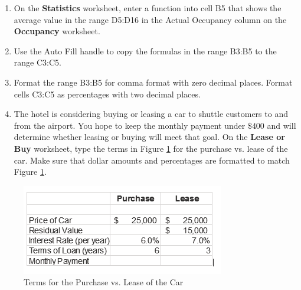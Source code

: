 \begin{enumerate}
	\item On the \textbf{Statistics} worksheet, enter a function into cell \textsf{B5} that shows the average value in the range \textsf{D5:D16} in the Actual Occupancy column on the \textbf{Occupancy} worksheet.
	
	\item Use the Auto Fill handle to copy the formulas in the range \textsf{B3:B5} to the range \textsf{C3:C5}.
	
	\item Format the range \textsf{B3:B5} for comma format with zero decimal places. Format cells \textsf{C3:C5} as percentages with two decimal places.
	
	\item The hotel is considering buying or leasing a car to shuttle customers to and from the airport. You hope to keep the monthly payment under $ \$400 $ and will determine whether leasing or buying will meet that goal. On the \textbf{Lease or Buy} worksheet, type the terms in Figure \ref{02:fig50} for the purchase vs. lease of the car. Make sure that dollar amounts and percentages are formatted to match Figure \ref{02:fig50}.
	\end{enumerate}

\begin{figure}[H]
	\centering
	\includegraphics[width=\maxwidth{.95\linewidth}]{gfx/ch02_fig50}
	\caption{Terms for the Purchase vs. Lease of the Car}
	\label{02:fig50}
\end{figure}

